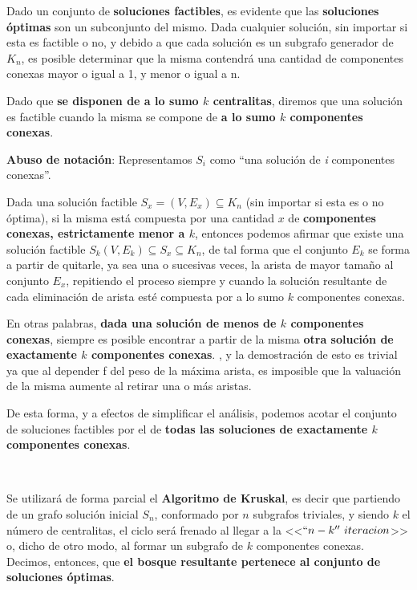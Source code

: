 \documentclass[11pt, a4paper, twoside]{article}
\begin{document}
Dado un conjunto de \textbf{soluciones factibles}, es evidente que las \textbf{soluciones óptimas}
son un subconjunto del mismo. Dada cualquier solución, sin importar si esta es factible o no, y
debido a que cada solución es un subgrafo generador de $K_{n}$, es posible determinar que la misma
contendrá una cantidad de componentes conexas mayor o igual a 1, y menor o igual a n.

Dado que \textbf{se disponen de a lo sumo $k$ centralitas}, diremos que una solución es factible
cuando la misma se compone de \textbf{a lo sumo $k$ componentes conexas}.

\textbf{Abuso de notación}: Representamos $S_{i}$ como ``una solución de \emph{i} componentes conexas''.

Dada una solución factible $S_{x} = (V, E_{x}) \subseteq K_{n}$ (sin importar si esta es o no
óptima), si la misma está compuesta por una cantidad $x$ de \textbf{componentes conexas,
estrictamente menor a $k$}, entonces podemos afirmar que existe una solución factible $S_{k} (V,
E_{k}) \subseteq S_{x} \subseteq K_{n}$, de tal forma que el conjunto $E_{k}$ se forma a partir de
quitarle, ya sea una o sucesivas veces, la arista de mayor tamaño al conjunto $E_{x}$, repitiendo el
proceso siempre y cuando la solución resultante de cada eliminación de arista esté compuesta por a
lo sumo $k$ componentes conexas.

En otras palabras, \textbf{dada una solución de menos de $k$ componentes conexas}, siempre es
posible encontrar a partir de la misma \textbf{otra solución de exactamente $k$ componentes
conexas}. , y la demostración de esto
es trivial ya que al depender f del peso de la máxima arista, es imposible que la valuación de la
misma aumente al retirar una o más aristas.

De esta forma, y a efectos de simplificar el análisis, podemos acotar el conjunto de soluciones
factibles por el de \textbf{todas las soluciones de exactamente $k$ componentes conexas}.

\begin{paragraph}\

Se utilizará de forma parcial el \textbf{Algoritmo de Kruskal}, es decir que partiendo de un grafo solución
inicial $S_{n}$, conformado por $n$ subgrafos triviales, y siendo $k$ el número de centralitas, el
ciclo será frenado al llegar a la <<$``n-k''~iteracion$>> o, dicho de otro modo, al formar un
subgrafo de $k$ componentes conexas. Decimos, entonces, que \textbf{el bosque resultante pertenece al
conjunto de soluciones óptimas}.
\end{paragraph}
\end{document}
